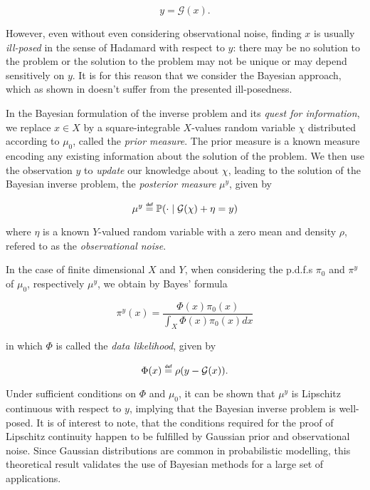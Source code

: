 \documentclass{article}
\newcommand\defeq{\mathrel{\overset{\makebox[0pt]{\mbox{\normalfont\tiny\sffamily def}}}{=}}}
\begin{document}
\begin{equation}
  y = \mathcal{G}(x).
  \label{inverse-problem}
\end{equation}

However, even without even considering observational noise, finding $x$ is usually \textit{ill-posed} in the sense of Hadamard \cite{hadamard}  with respect to $y$: there may be no solution to the problem or the solution to the problem may not be unique or may depend sensitively on $y$. It is for this reason that we consider the Bayesian approach, which as shown in \cite{stuart_2010} doesn't suffer from the presented ill-posedness.

In the Bayesian formulation of the inverse problem and its \textit{quest for information}, we replace $x \in X$ by a square-integrable $X$-values random variable $\chi$ distributed according to $\mu_0$, called the \textit{prior measure}. The prior measure is a known measure encoding any existing information about the solution of the problem. We then use the observation $y$ to \textit{update} our knowledge about $\chi$, leading to the solution of the Bayesian inverse problem, the \textit{posterior measure} $\mu^y$, given by

\begin{equation}
  \mu^y \defeq \mathbb{P}(\cdot \mid \mathcal{G}(\chi) + \eta = y)
  \label{bayesian inverse problem}
\end{equation}

where $\eta$ is a known $Y$-valued random variable with a zero mean and density $\rho$, refered to as the \textit{observational noise}. 

In the case of finite dimensional $X$ and $Y$, when considering the p.d.f.s $\pi_0$ and $\pi^y$ of $\mu_0$, respectively $\mu^y$, we obtain by Bayes' formula

\begin{equation}
  \pi^y(x) = \frac{\Phi(x)\pi_0(x)}{\int_X\Phi(x)\pi_0(x)dx}
  \label{def_posterior}
\end{equation}

in which $\Phi$ is called the \textit{data likelihood}, given by

\begin{equation}
  \Phi(x) \defeq \rho(y - \mathcal{G}(x)).
\end{equation}

Under sufficient conditions on $\Phi$ and $\mu_0$, it can be shown \cite{stuart_2010} that $\mu^y$ is Lipschitz continuous with respect to $y$, implying that the Bayesian inverse problem is well-posed. It is of interest to note, that the conditions required for the proof of Lipschitz continuity happen to be fulfilled by Gaussian prior and observational noise. Since Gaussian distributions are common in probabilistic modelling, this theoretical result validates the use of Bayesian methods for a large set of applications.
\end{document}
